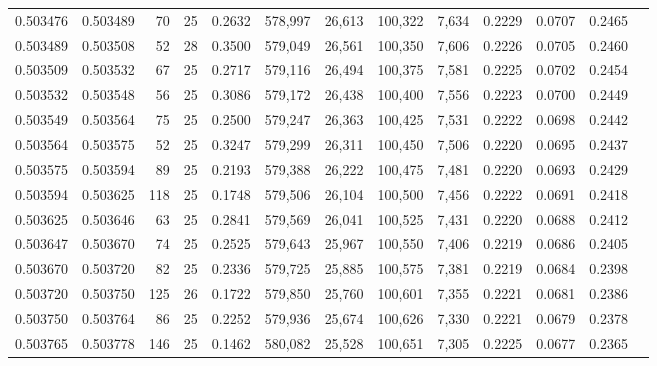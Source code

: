 \begin{tabular}{rrrrrrrrrrrrr}
0.503476 & 0.503489 &  70 &  25 &                                     0.2632 & 578,997 &  26,613 & 100,322 &   7,634 & 0.2229 & 0.0707 & 0.2465 \\
0.503489 & 0.503508 &  52 &  28 &                                     0.3500 & 579,049 &  26,561 & 100,350 &   7,606 & 0.2226 & 0.0705 & 0.2460 \\
0.503509 & 0.503532 &  67 &  25 &                                     0.2717 & 579,116 &  26,494 & 100,375 &   7,581 & 0.2225 & 0.0702 & 0.2454 \\
0.503532 & 0.503548 &  56 &  25 &                                     0.3086 & 579,172 &  26,438 & 100,400 &   7,556 & 0.2223 & 0.0700 & 0.2449 \\
0.503549 & 0.503564 &  75 &  25 &                                     0.2500 & 579,247 &  26,363 & 100,425 &   7,531 & 0.2222 & 0.0698 & 0.2442 \\
0.503564 & 0.503575 &  52 &  25 &                                     0.3247 & 579,299 &  26,311 & 100,450 &   7,506 & 0.2220 & 0.0695 & 0.2437 \\
0.503575 & 0.503594 &  89 &  25 &                                     0.2193 & 579,388 &  26,222 & 100,475 &   7,481 & 0.2220 & 0.0693 & 0.2429 \\
0.503594 & 0.503625 & 118 &  25 &                                     0.1748 & 579,506 &  26,104 & 100,500 &   7,456 & 0.2222 & 0.0691 & 0.2418 \\
0.503625 & 0.503646 &  63 &  25 &                                     0.2841 & 579,569 &  26,041 & 100,525 &   7,431 & 0.2220 & 0.0688 & 0.2412 \\
0.503647 & 0.503670 &  74 &  25 &                                     0.2525 & 579,643 &  25,967 & 100,550 &   7,406 & 0.2219 & 0.0686 & 0.2405 \\
0.503670 & 0.503720 &  82 &  25 &                                     0.2336 & 579,725 &  25,885 & 100,575 &   7,381 & 0.2219 & 0.0684 & 0.2398 \\
0.503720 & 0.503750 & 125 &  26 &                                     0.1722 & 579,850 &  25,760 & 100,601 &   7,355 & 0.2221 & 0.0681 & 0.2386 \\
0.503750 & 0.503764 &  86 &  25 &                                     0.2252 & 579,936 &  25,674 & 100,626 &   7,330 & 0.2221 & 0.0679 & 0.2378 \\
0.503765 & 0.503778 & 146 &  25 &                                     0.1462 & 580,082 &  25,528 & 100,651 &   7,305 & 0.2225 & 0.0677 & 0.2365 \\

\end{tabular}

